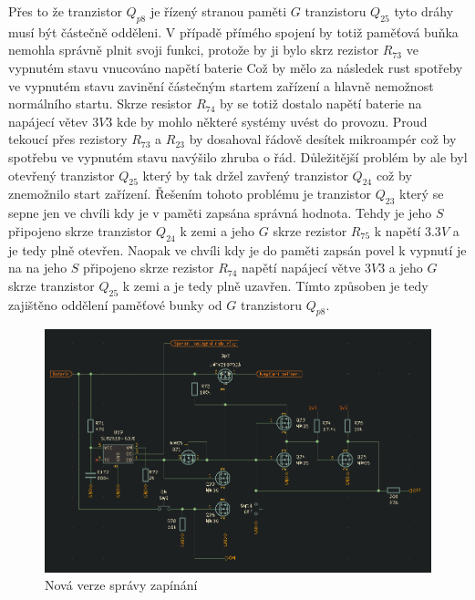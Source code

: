 Přes to že tranzistor \(Q_{p8}\) je řízený stranou paměti \(G\) tranzistoru \(Q_{25}\) tyto dráhy musí být částečně odděleni.
V případě přímého spojení by totiž paměťová buňka nemohla správně plnit svoji funkci, protože by ji bylo skrz rezistor \(R_{73}\) ve vypnutém stavu vnucováno napětí baterie
Což by mělo za následek rust spotřeby ve vypnutém stavu zavinění částečným startem zařízení a hlavně nemožnost normálního startu.
Skrze resistor \(R_{74}\) by se totiž dostalo napětí baterie na napájecí větev \(3V3\) kde by mohlo některé systémy uvést do provozu.
Proud tekoucí přes rezistory \(R_{73}\) a \(R_{23}\) by dosahoval řádově desítek mikroampér což by spotřebu ve vypnutém stavu navýšilo zhruba o řád.
Důležitější problém by ale byl otevřený tranzistor \(Q_{25}\) který by tak držel zavřený tranzistor \(Q_{24}\) což by znemožnilo start zařízení.
Řešením tohoto problému je tranzistor \(Q_{23}\) který se sepne jen ve chvíli kdy je v paměti zapsána správná hodnota.
Tehdy je jeho \(S\) připojeno skrze tranzistor \(Q_{24}\) k zemi a jeho \(G\) skrze rezistor \(R_{75}\) k napětí \(3.3 V\) a je tedy plně otevřen.
Naopak ve chvíli kdy je do paměti zapsán povel k vypnutí je na na jeho \(S\) připojeno skrze rezistor \(R_{74}\) napětí napájecí větve \(3V3\) a jeho \(G\) skrze tranzistor \(Q_{25}\) k zemi a je tedy plně uzavřen.
Tímto způsoben je tedy zajištěno oddělení paměťové bunky od \(G\) tranzistoru \(Q_{p8}\).


\begin{figure}[h!]
    \centering
    \includegraphics[width=\textwidth]{text/PraktickaCast/img/power_manager.png}
    \caption{Nová verze správy zapínání}
    \label{fig:PoverManager}
\end{figure}

